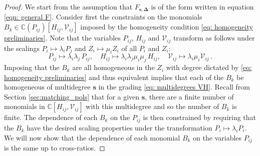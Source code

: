 \documentclass[12pt,a4paper]{extarticle}
\theoremstyle{definition}
\begin{document}
\begin{proof}
    We start from the assumption that $F_{\mathbf{s},\mathbf{\Delta}}$ is of the form written in equation \eqref{eqn: general F}. Consider first the constraints on the monomials $B_k\in\mathbb{C}(P_{ij})[H_{ij},\mathcal{V}_{ij}]$ imposed by the homogeneity condition \eqref{eq: homogeneity preliminaries}. Note that the variables $P_{ij}$, $H_{ij}$ and $\mathcal{V}_{ij}$ transform as follows under the scalings $P_i\mapsto\lambda_iP_j$ and $Z_i\mapsto\mu_iZ_i$ of all $P_i$ and $Z_i$:
    \begin{equation} \label{eq:scalingPHV}
    P_{ij} \mapsto\lambda_i \lambda_j\, P_{ij}, \quad H_{ij} \mapsto \lambda_i\lambda_j \mu_i \mu_j\, H _{ij}, \quad \mathcal{V}_{ij} \mapsto \lambda_i \mu_i\mathcal{V}_{ij}\,. 
    \end{equation}
    Imposing that the $B_k$ are all homogeneous in the $Z_i$ with degree dictated by \eqref{eq: homogeneity preliminaries} and thus equivalent implies that each of the $B_k$ be homogeneous of multidegree $\mathbf{s}$ in the grading \eqref{eq: multidegrees VH}. 
    Recall from Section \ref{sec:matching_pols} that for a given $\mathbf{s}$, there are a finite number of monomials in $\mathbb{C}[H_{ij},\mathcal{V}_{ij}]$ with this multidegree and so the number of $B_k$ is finite. 
    The dependence of each $B_k$ on the $P_{ij}$ is then constrained by requiring that the $B_k$ have the desired scaling properties under the transformation $P_i\mapsto\lambda_iP_i$. 
    We will now show that the dependence of each monomial $B_k$ on the variables $P_{ij}$ is the same up to cross-ratios.

    \medskip
    

\end{proof}
\end{document}

